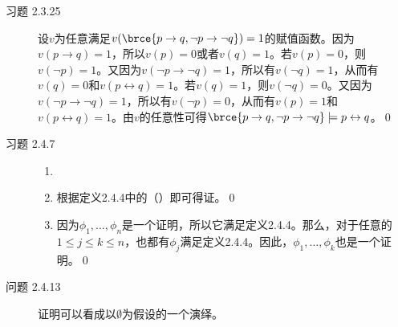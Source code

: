\documentclass[punct=custom/kaiming,fontset=none]{ctexart}
\newcommand*{\enumparen}[1]{\textnormal{（}\makebox[0.5em][c]{#1}\textnormal{）}}
\let\leq\leqslant
\let\le\leq
\begin{document}
\begin{description}
\begin{enumerate}
  \end{enumerate}
\item[习题 2.3.25] 设\(v\)为任意满足\(v(\brce{p \to q, \neg p \to \neg q}) = 1\)的赋值函数。因为\(v(p \to q) = 1\)，所以\(v(p) = 0\)或者\(v(q) = 1\)。若\(v(p) = 0\)，则\(v(\neg p) = 1\)。又因为\(v(\neg p \to \neg q) = 1\)，所以有\(v(\neg q) = 1\)，从而有\(v(q) = 0\)和\(v(p \leftrightarrow q) = 1\)。若\(v(q) = 1\)，则\(v(\neg q) = 0\)。又因为\(v(\neg p \to \neg q) = 1\)，所以有\(v(\neg p) = 0\)，从而有\(v(p) = 1\)和\(v(p \leftrightarrow q) = 1\)。由\(v\)的任意性可得\(\brce{p \to q, \neg p \to \neg q} \models p \leftrightarrow q\)。\qed
\item[习题 2.4.7]
  \begin{enumerate}
  \item[]
  \item 根据定义2.4.4中的\enumparen{1}即可得证。\qed
  \item 因为\(\phi_1, \dotsc, \phi_n\)是一个证明，所以它满足定义2.4.4。那么，对于任意的\(1 \le j \le k \le n\)，也都有\(\phi_j\)满足定义2.4.4。因此，\(\phi_1, \dotsc, \phi_k\)也是一个证明。\qed
  \end{enumerate}
\item[问题 2.4.13] 证明可以看成以\(\emptyset\)为假设的一个演绎。
\end{description}
\end{document}
